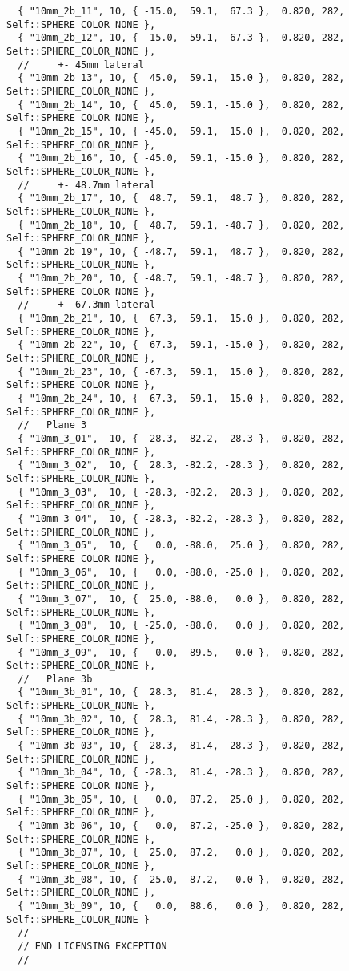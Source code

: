 \documentclass{InsightArticle}
\begin{document}
{\begin{verbatim}
  { "10mm_2b_11", 10, { -15.0,  59.1,  67.3 },  0.820, 282, Self::SPHERE_COLOR_NONE },
  { "10mm_2b_12", 10, { -15.0,  59.1, -67.3 },  0.820, 282, Self::SPHERE_COLOR_NONE },
  //     +- 45mm lateral
  { "10mm_2b_13", 10, {  45.0,  59.1,  15.0 },  0.820, 282, Self::SPHERE_COLOR_NONE },
  { "10mm_2b_14", 10, {  45.0,  59.1, -15.0 },  0.820, 282, Self::SPHERE_COLOR_NONE },
  { "10mm_2b_15", 10, { -45.0,  59.1,  15.0 },  0.820, 282, Self::SPHERE_COLOR_NONE },
  { "10mm_2b_16", 10, { -45.0,  59.1, -15.0 },  0.820, 282, Self::SPHERE_COLOR_NONE },
  //     +- 48.7mm lateral
  { "10mm_2b_17", 10, {  48.7,  59.1,  48.7 },  0.820, 282, Self::SPHERE_COLOR_NONE },
  { "10mm_2b_18", 10, {  48.7,  59.1, -48.7 },  0.820, 282, Self::SPHERE_COLOR_NONE },
  { "10mm_2b_19", 10, { -48.7,  59.1,  48.7 },  0.820, 282, Self::SPHERE_COLOR_NONE },
  { "10mm_2b_20", 10, { -48.7,  59.1, -48.7 },  0.820, 282, Self::SPHERE_COLOR_NONE },
  //     +- 67.3mm lateral
  { "10mm_2b_21", 10, {  67.3,  59.1,  15.0 },  0.820, 282, Self::SPHERE_COLOR_NONE },
  { "10mm_2b_22", 10, {  67.3,  59.1, -15.0 },  0.820, 282, Self::SPHERE_COLOR_NONE },
  { "10mm_2b_23", 10, { -67.3,  59.1,  15.0 },  0.820, 282, Self::SPHERE_COLOR_NONE },
  { "10mm_2b_24", 10, { -67.3,  59.1, -15.0 },  0.820, 282, Self::SPHERE_COLOR_NONE },
  //   Plane 3
  { "10mm_3_01",  10, {  28.3, -82.2,  28.3 },  0.820, 282, Self::SPHERE_COLOR_NONE },
  { "10mm_3_02",  10, {  28.3, -82.2, -28.3 },  0.820, 282, Self::SPHERE_COLOR_NONE },
  { "10mm_3_03",  10, { -28.3, -82.2,  28.3 },  0.820, 282, Self::SPHERE_COLOR_NONE },
  { "10mm_3_04",  10, { -28.3, -82.2, -28.3 },  0.820, 282, Self::SPHERE_COLOR_NONE },
  { "10mm_3_05",  10, {   0.0, -88.0,  25.0 },  0.820, 282, Self::SPHERE_COLOR_NONE },
  { "10mm_3_06",  10, {   0.0, -88.0, -25.0 },  0.820, 282, Self::SPHERE_COLOR_NONE },
  { "10mm_3_07",  10, {  25.0, -88.0,   0.0 },  0.820, 282, Self::SPHERE_COLOR_NONE },
  { "10mm_3_08",  10, { -25.0, -88.0,   0.0 },  0.820, 282, Self::SPHERE_COLOR_NONE },
  { "10mm_3_09",  10, {   0.0, -89.5,   0.0 },  0.820, 282, Self::SPHERE_COLOR_NONE },
  //   Plane 3b
  { "10mm_3b_01", 10, {  28.3,  81.4,  28.3 },  0.820, 282, Self::SPHERE_COLOR_NONE },
  { "10mm_3b_02", 10, {  28.3,  81.4, -28.3 },  0.820, 282, Self::SPHERE_COLOR_NONE },
  { "10mm_3b_03", 10, { -28.3,  81.4,  28.3 },  0.820, 282, Self::SPHERE_COLOR_NONE },
  { "10mm_3b_04", 10, { -28.3,  81.4, -28.3 },  0.820, 282, Self::SPHERE_COLOR_NONE },
  { "10mm_3b_05", 10, {   0.0,  87.2,  25.0 },  0.820, 282, Self::SPHERE_COLOR_NONE },
  { "10mm_3b_06", 10, {   0.0,  87.2, -25.0 },  0.820, 282, Self::SPHERE_COLOR_NONE },
  { "10mm_3b_07", 10, {  25.0,  87.2,   0.0 },  0.820, 282, Self::SPHERE_COLOR_NONE },
  { "10mm_3b_08", 10, { -25.0,  87.2,   0.0 },  0.820, 282, Self::SPHERE_COLOR_NONE },
  { "10mm_3b_09", 10, {   0.0,  88.6,   0.0 },  0.820, 282, Self::SPHERE_COLOR_NONE }
  // 
  // END LICENSING EXCEPTION
  //
\end{verbatim}
}
\end{document}
